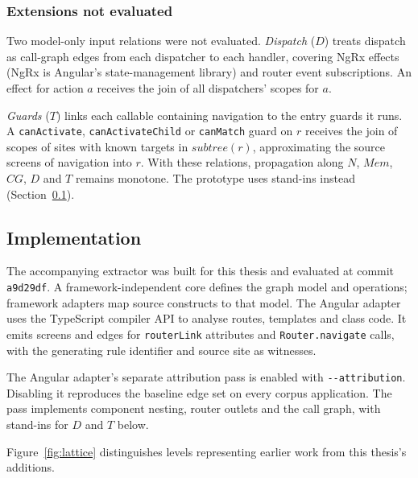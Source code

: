 \subsubsection{Extensions not evaluated}
\label{sec:extensions}

Two model-only input relations were not evaluated. \emph{Dispatch} ($D$) treats dispatch as
call-graph edges from each dispatcher to each handler, covering NgRx effects (NgRx is Angular's
state-management library) and router event subscriptions. An effect for action $a$ receives
the join of all dispatchers' scopes for $a$.

\emph{Guards} ($T$) links each callable containing navigation to the entry guards it runs.
A \texttt{canActivate}, \texttt{canActivateChild} or \texttt{canMatch} guard on $r$ receives
the join of scopes of sites with known targets in $\mathit{subtree}(r)$, approximating the
source screens of navigation into $r$. With these relations, propagation along $N$,
$\mathit{Mem}$, $\mathit{CG}$, $D$ and $T$ remains monotone. The prototype uses stand-ins
instead (Section~\ref{sec:implementation}).

\subsection{Implementation}
\label{sec:implementation}

The accompanying extractor was built for this thesis and evaluated at commit \texttt{a9d29df}. A framework-independent core defines the graph model and
operations; framework adapters map source constructs to that model. The Angular adapter uses
the TypeScript compiler API to analyse routes, templates and class code. It emits screens and
edges for \texttt{routerLink} attributes and \texttt{Router.navigate} calls, with the generating
rule identifier and source site as witnesses.

The Angular adapter's separate attribution pass is enabled with \texttt{-{}-attribution}.
Disabling it reproduces the baseline edge set on every corpus application. The pass implements
component nesting, router outlets and the call graph, with stand-ins for $D$ and $T$ below.

Figure~\ref{fig:lattice} distinguishes levels representing earlier work from this thesis's additions.

